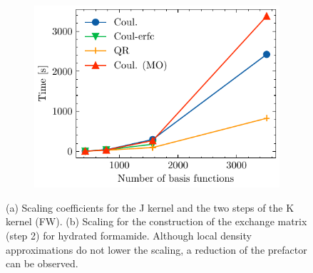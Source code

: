 \begin{figure}[htp]

\begin{subtable}{\textwidth}
\caption{}
\label{tab:GS_DFJKSCALE_FW}
\end{subtable}

\vspace{1.5\baselineskip}

\begin{subfigure}{\textwidth}
\centering
\includegraphics[scale=1.0]{Pics/hfK2_fw}
\caption{}
\label{fig:GS_DFK2SCALE_FW}
\end{subfigure}

\caption[Scaling behavior of the J and K kernels for FW]{(a) Scaling coefficients for the J kernel and the two steps of the K kernel (FW). (b) Scaling for the construction of the exchange matrix (step 2) for hydrated formamide. Although local density approximations do not lower the scaling, a reduction of the prefactor can be observed.}

\end{figure}

